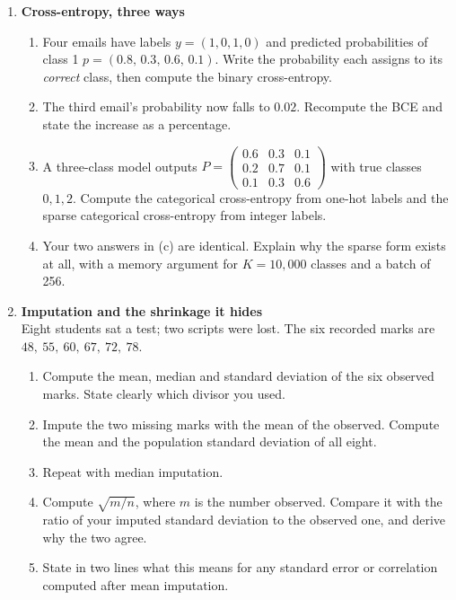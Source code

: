 \documentclass[11pt,a4paper]{article}
\begin{document}
\begin{enumerate}[label=\textbf{B\arabic*.}, leftmargin=*]
  \item \textbf{Cross-entropy, three ways} \\
    \begin{enumerate}[label=(\alph*), leftmargin=*]
      \item Four emails have labels $y = (1,0,1,0)$ and predicted
        probabilities of class 1 $p = (0.8,\,0.3,\,0.6,\,0.1)$. Write the
        probability each assigns to its \emph{correct} class, then compute the
        binary cross-entropy. 
      \item The third email's probability now falls to $0.02$. Recompute the
        BCE and state the increase as a percentage. 
      \item A three-class model outputs
        $P = \left(\begin{smallmatrix} 0.6 & 0.3 & 0.1\\ 0.2 & 0.7 & 0.1\\
        0.1 & 0.3 & 0.6\end{smallmatrix}\right)$ with true classes $0,1,2$.
        Compute the categorical cross-entropy from one-hot labels and the
        sparse categorical cross-entropy from integer labels. 
      \item Your two answers in (c) are identical. Explain why the sparse form
        exists at all, with a memory argument for $K = 10{,}000$ classes and a
        batch of 256. 
    \end{enumerate}

  \item \textbf{Imputation and the shrinkage it hides} \\
    Eight students sat a test; two scripts were lost. The six recorded marks
    are $48,\ 55,\ 60,\ 67,\ 72,\ 78$.
    \begin{enumerate}[label=(\alph*), leftmargin=*]
      \item Compute the mean, median and standard deviation of the six observed
        marks. State clearly which divisor you used. 
      \item Impute the two missing marks with the mean of the observed. Compute
        the mean and the population standard deviation of all eight. 
      \item Repeat with median imputation. 
      \item Compute $\sqrt{m/n}$, where $m$ is the number observed. Compare it
        with the ratio of your imputed standard deviation to the observed one,
        and derive why the two agree. 
      \item State in two lines what this means for any standard error or
        correlation computed after mean imputation. 
    \end{enumerate}


\end{enumerate}
\end{document}
